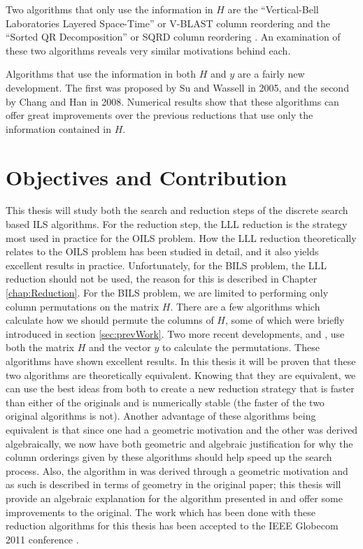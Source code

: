 \documentclass[12pt,Bold,letterpaper]{mcgilletdclass}
\newcommand{\vsp}{\vspace{\baselineskip}}
\begin{document}
Two algorithms that only use the information in $H$ are the ``Vertical-Bell Laboratories Layered Space-Time'' or V-BLAST column reordering \cite{FosGVW99} and the ``Sorted QR Decomposition'' or SQRD column reordering \cite{WubBRKK01}. An examination of these two algorithms reveals very similar motivations behind each.

Algorithms that use the information in both $H$ and $y$ are a fairly new development. The first was proposed by Su and Wassell \cite{SuW05} in 2005, and the second by Chang and Han \cite{ChaH05} in 2008. Numerical results show that these algorithms can offer great improvements over the previous reductions that use only the information contained in $H$.

\vsp \section{Objectives and Contribution}

This thesis will study both the search and reduction steps of the discrete search based ILS algorithms. For the reduction step, the LLL reduction \cite{LenLL82} is the strategy most used in practice for the OILS problem. How the LLL reduction theoretically relates to the OILS problem has been studied in detail, and it also yields excellent results in practice. Unfortunately, for the BILS problem, the LLL reduction should not be used, the reason for this is described in Chapter \ref{chap:Reduction}. For the BILS problem, we are limited to performing only column permutations on the matrix $H$. There are a few algorithms which calculate how we should permute the columns of $H$, some of which were briefly introduced in section \ref{sec:prevWork}. Two more recent developments, \cite{ChaH05} and \cite{SuW05}, use both the matrix $H$ and the vector $y$ to calculate the permutations. These algorithms have shown excellent results. In this thesis it will be proven that these two algorithms are theoretically equivalent. Knowing that they are equivalent, we can use the best ideas from both to create a new reduction strategy that is faster than either of the originals and is numerically stable (the faster of the two original algorithms is not). Another advantage of these algorithms being equivalent is that since one had a geometric motivation and the other was derived algebraically, we now have both geometric and algebraic justification for why the column orderings given by these algorithms should help speed up the search process. Also, the algorithm in \cite{SuW05} was derived through a geometric motivation and as such is described in terms of geometry in the original paper; this thesis will provide an algebraic explanation for the algorithm presented in \cite{SuW05} and offer some improvements to the original. The work which has been done with these reduction algorithms for this thesis has been accepted to the IEEE Globecom 2011 conference \cite{BreC11}.
\end{document}

